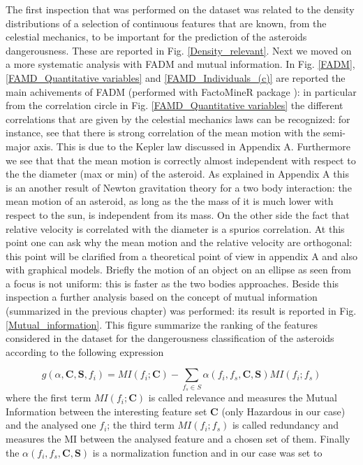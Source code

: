 \documentclass[12pt,%
               a4paper,%
               oneside,openany,%
               titlepage,%
               headinclude,footinclude,%
               BCOR5mm,%
               cleardoublepage=empty,%
               tablecaptionabove,%
               floatperchapter,
               ]{scrreprt}                 %
\begin{document}
The first inspection that was performed on the dataset was related to the density distributions of a selection of continuous features that are known, from the celestial mechanics, to be important for the prediction of the asteroids dangerousness. These are reported in Fig. \ref{Density_relevant}. Next we moved on a more systematic analysis with FADM and mutual information. In Fig. \ref{FADM},\ref{FAMD_Quantitative variables} and \ref{FAMD_Individuals_(c)} are reported the main achivements of FADM (performed with FactoMineR package \cite{le2008factominer}): in particular from the correlation circle in Fig. \ref{FAMD_Quantitative variables} the different correlations that are given by the celestial mechanics laws can be recognized: for instance, see that there is strong correlation of the mean motion with the semi-major axis. This is due to the Kepler law discussed in Appendix A. Furthermore we see that that the mean motion is correctly almost independent with respect to the the diameter (max or min) of  the asteroid. As explained in Appendix A this is an another result of Newton gravitation theory for a two body interaction: the mean motion of an asteroid, as long as the the mass of it is much lower with respect to the sun, is independent from its mass. On the other side the fact that relative velocity is correlated with the diameter is a spurios correlation. At this point one can ask why the mean motion and the relative velocity are orthogonal: this point will be clarified from a theoretical point of view in appendix A and also with graphical models. Briefly the motion of an object on an ellipse as seen from a focus is not uniform: this is faster as the two bodies approaches. Beside this inspection a further analysis based on the concept of mutual information (summarized in the previous chapter) was performed: its result is reported in Fig. \ref{Mutual_information}. This figure summarize the ranking of the features considered in the dataset for the dangerousness classification of the asteroids according to the following expression \cite{kratzer2018varrank}

\begin{equation}
g(\alpha,\textbf{C},\textbf{S},f_{i})=MI(f_{i};\textbf{C})-\sum_{f_{s}\in S}\alpha(f_{i},f_{s},\textbf{C},\textbf{S})MI(f_{i};f_{s})
\end{equation}
where the first term $MI(f_{i};\textbf{C})$ is called relevance and measures the Mutual Information between the interesting feature set $\textbf{C}$ (only Hazardous in our case) and the analysed one $f_{i}$; the third term $MI(f_{i};f_{s})$ is called redundancy and measures the MI between the analysed feature and a chosen set of them. Finally the $\alpha(f_{i},f_{s},\textbf{C},\textbf{S})$ is a normalization function and in our case was set to \cite{kratzer2018varrank}
\end{document}
